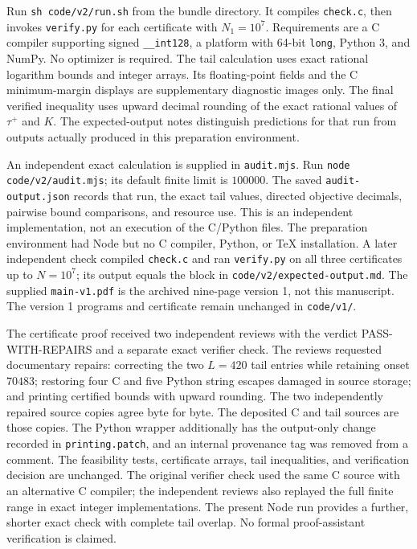 \documentclass[10pt]{article}
\theoremstyle{remark}
\begin{document}
Run \texttt{sh code/v2/run.sh} from the bundle directory. It compiles
\texttt{check.c}, then invokes \texttt{verify.py} for each certificate
with $N_1=10^7$. Requirements are a C compiler supporting signed
\texttt{\_\_int128}, a platform with 64-bit \texttt{long}, Python 3,
and NumPy. No optimizer is required. The tail calculation uses exact
rational logarithm bounds and integer arrays. Its floating-point
fields and the C minimum-margin displays are supplementary diagnostic
images only. The final verified inequality uses upward decimal
rounding of the exact rational values of $\tau^+$ and $K$.
The expected-output notes distinguish predictions for that run from
outputs actually produced in this preparation environment.

An independent exact calculation is supplied in \texttt{audit.mjs}.
Run \texttt{node code/v2/audit.mjs}; its default finite limit is
$100000$. The saved \texttt{audit-output.json} records that run,
the exact tail values, directed objective decimals, pairwise bound
comparisons, and resource use. This is an independent implementation,
not an execution of the C/Python files. The preparation environment
had Node but no C compiler, Python, or TeX installation. A later
independent check compiled \texttt{check.c} and ran \texttt{verify.py}
on all three certificates up to $N=10^7$; its output equals the block in
\texttt{code/v2/expected-output.md}. The supplied \texttt{main-v1.pdf} is
the archived nine-page version 1, not this manuscript. The version 1
programs and certificate remain unchanged in \texttt{code/v1/}.

The certificate proof received two independent reviews with the
verdict PASS-WITH-REPAIRS and a separate exact verifier check.
The reviews requested documentary repairs: correcting the two
$L=420$ tail entries while retaining onset $70483$; restoring four C
and five Python string escapes damaged in source storage; and printing
certified bounds with upward rounding. The two independently repaired
source copies agree byte for byte. The deposited C and tail sources
are those copies. The Python wrapper additionally has the output-only
change recorded in \texttt{printing.patch}, and an internal provenance
tag was removed from a comment. The feasibility tests, certificate
arrays, tail inequalities, and verification decision are unchanged.
The original verifier check used the same C source with an alternative
C compiler; the independent reviews also replayed the full finite
range in exact integer implementations. The present Node run provides
a further, shorter exact check with complete tail overlap. No formal
proof-assistant verification is claimed.
\end{document}
